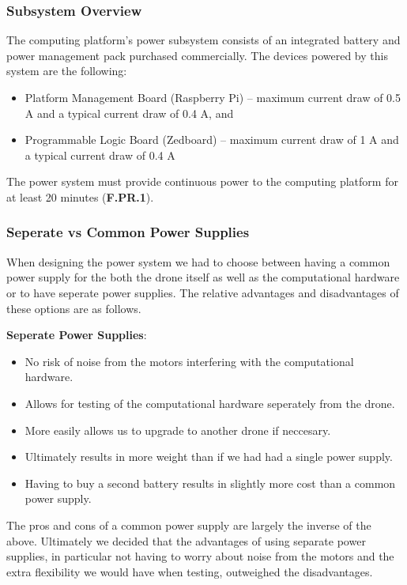 \subsubsection{Subsystem Overview}
The computing platform's power subsystem consists of an integrated battery and power management pack purchased commercially. The devices powered by this system are the following:

\begin{itemize}
\item Platform Management Board (Raspberry Pi) -- maximum current draw of 0.5 A and a typical current draw of 0.4 A, and
\item Programmable Logic Board (Zedboard) -- maximum current draw of 1 A and a typical current draw of 0.4 A
\end{itemize}

The power system must provide continuous power to the computing platform for at least 20 minutes (\textbf{F.PR.1}).

\subsubsection{Seperate vs Common Power Supplies}
When designing the power system we had to choose between having a common power supply for the both the drone itself as well as the computational hardware or to have seperate power supplies. The relative advantages and disadvantages of these options are as follows.

\textbf{Seperate Power Supplies}:
\begin{itemize}
    \item No risk of noise from the motors interfering with the computational hardware.
    \item Allows for testing of the computational hardware seperately from the drone.
    \item More easily allows us to upgrade to another drone if neccesary.
    \item Ultimately results in more weight than if we had had a single power supply.
    \item Having to buy a second battery results in slightly more cost than a common power supply.
\end{itemize}

The pros and cons of a common power supply are largely the inverse of the above. Ultimately we decided that the advantages of using separate power supplies, in particular not having to worry about noise from the motors and the extra flexibility we would have when testing, outweighed the disadvantages.

